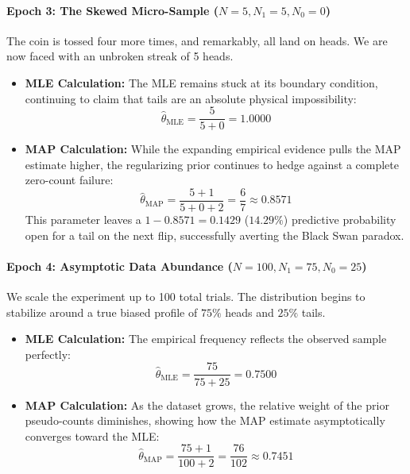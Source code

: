 \documentclass{article}
\begin{document}
\paragraph{Epoch 3: The Skewed Micro-Sample ($N = 5, N_1 = 5, N_0 = 0$)}
The coin is tossed four more times, and remarkably, all land on heads. We are now faced with an unbroken streak of 5 heads.
\begin{itemize}
    \item \textbf{MLE Calculation:} The MLE remains stuck at its boundary condition, continuing to claim that tails are an absolute physical impossibility:
    \begin{equation}
    \hat{\theta}_{\text{MLE}} = \frac{5}{5 + 0} = \mathbf{1.0000}
    \end{equation}
    \item \textbf{MAP Calculation:} While the expanding empirical evidence pulls the MAP estimate higher, the regularizing prior continues to hedge against a complete zero-count failure:
    \begin{equation}
    \hat{\theta}_{\text{MAP}} = \frac{5 + 1}{5 + 0 + 2} = \frac{6}{7} \approx \mathbf{0.8571}
    \end{equation}
    This parameter leaves a $1 - 0.8571 = \mathbf{0.1429}$ ($14.29\%$) predictive probability open for a tail on the next flip, successfully averting the Black Swan paradox.
\end{itemize}

\paragraph{Epoch 4: Asymptotic Data Abundance ($N = 100, N_1 = 75, N_0 = 25$)}
We scale the experiment up to 100 total trials. The distribution begins to stabilize around a true biased profile of $75\%$ heads and $25\%$ tails.
\begin{itemize}
    \item \textbf{MLE Calculation:} The empirical frequency reflects the observed sample perfectly:
    \begin{equation}
    \hat{\theta}_{\text{MLE}} = \frac{75}{75 + 25} = \mathbf{0.7500}
    \end{equation}
    \item \textbf{MAP Calculation:} As the dataset grows, the relative weight of the prior pseudo-counts diminishes, showing how the MAP estimate asymptotically converges toward the MLE:
    \begin{equation}
    \hat{\theta}_{\text{MAP}} = \frac{75 + 1}{100 + 2} = \frac{76}{102} \approx \mathbf{0.7451}
    \end{equation}
\end{itemize}
\end{document}
